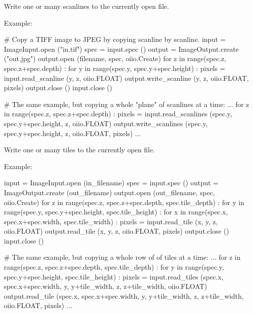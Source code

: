 Write one or many scanlines to the currently open file.

\noindent Example:
\begin{code}
    # Copy a TIFF image to JPEG by copying scanline by scanline.
    input = ImageInput.open ("in.tif")
    spec = input.spec ()
    output = ImageOutput.create ("out.jpg")
    output.open (filename, spec, oiio.Create)
    for z in range(spec.z, spec.z+spec.depth) :
        for y in range(spec.y, spec.y+spec.height) :
            pixels = input.read_scanline (y, z, oiio.FLOAT)
            output.write_scanline (y, z, oiio.FLOAT, pixels)
    output.close ()
    input.close ()

    # The same example, but copying a whole "plane" of scanlines at a time:
    ...
    for z in range(spec.z, spec.z+spec.depth) :
        pixels = input.read_scanlines (spec.y, spec.y+spec.height,
                                       z, oiio.FLOAT)
        output.write_scanlines (spec.y, spec.y+spec.height,
                                z, oiio.FLOAT, pixels)
    ...
\end{code}
\apiend


Write one or many tiles to the currently open file.

\noindent Example:
\begin{code}
    input = ImageInput.open (in_filename)
    spec = input.spec ()
    output = ImageOutput.create (out_filename)
    output.open (out_filename, spec, oiio.Create)
    for z in range(spec.z, spec.z+spec.depth, spec.tile_depth) :
        for y in range(spec.y, spec.y+spec.height, spec.tile_height) :
            for x in range(spec.x, spec.x+spec.width, spec.tile_width) :
                pixels = input.read_tile (x, y, z, oiio.FLOAT)
                output.read_tile (x, y, z, oiio.FLOAT, pixels)
    output.close ()
    input.close ()

    # The same example, but copying a whole row of of tiles at a time:
    ...
    for z in range(spec.z, spec.z+spec.depth, spec.tile_depth) :
        for y in range(spec.y, spec.y+spec.height, spec.tile_height) :
            pixels = input.read_tiles (spec.x, spec.x+spec.width,
                                       y, y+tile_width,
                                       z, z+tile_width, oiio.FLOAT)
            output.read_tile (spec.x, spec.x+spec.width,
                              y, y+tile_width, z, z+tile_width,
                              oiio.FLOAT, pixels)
    ...
\end{code}
\apiend

